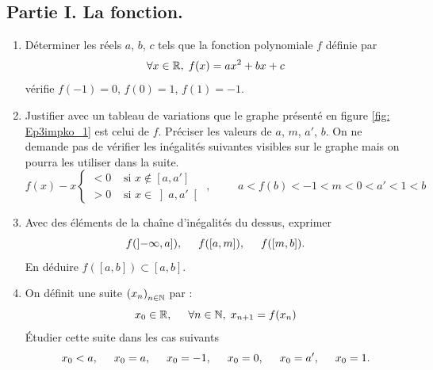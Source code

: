 \subsection*{Partie I. La fonction.}
\begin{enumerate}
  \item Déterminer les réels $a$, $b$, $c$ tels que la fonction polynomiale $f$ définie par 
\begin{displaymath}
  \forall x\in\mathbb{R},\; f(x) = ax^2 + bx + c
\end{displaymath}
vérifie $f(-1) = 0$, $f(0) = 1$, $f(1) = -1$.

  \item Justifier avec un tableau de variations que le graphe présenté en figure \ref{fig: Ep3impko_1} est celui de $f$. Préciser les valeurs de $a$, $m$, $a'$, $b$. On ne demande pas de vérifier les inégalités suivantes visibles sur le graphe mais on pourra les utiliser dans la suite.
\begin{displaymath}
f(x) - x 
\left\lbrace 
\begin{aligned}
  < 0 &\text{ si } x \notin \left[ a, a' \right]  \\
  > 0 &\text{ si } x \in \left] a, a' \right[
\end{aligned}
\right., \hspace{1cm}
a < f(b) < -1 < m < 0 < a' < 1 < b
\end{displaymath}

  \item Avec des éléments de la chaîne d'inégalités du dessus, exprimer
\begin{displaymath}
  f(\left] -\infty , a\right]),\hspace{0.5cm} f([a,m]),\hspace{0.5cm} f([m,b]).
\end{displaymath}
En déduire $f([a,b])\subset [a,b]$.

  \item On définit une suite $\left( x_n\right)_{n\in \mathbb{N}}$ par :
  \begin{displaymath}
x_0 \in \mathbb{R}, \hspace{0.5cm} \forall n\in \mathbb{N}, \; x_{n+1} = f(x_n)    
  \end{displaymath}
\'Etudier cette suite dans les cas suivants
\begin{displaymath}
  x_0 < a, \hspace{0.5cm} x_0 = a, \hspace{0.5cm} x_0 = -1, \hspace{0.5cm} x_0 = 0, \hspace{0.5cm}
   x_0 = a', \hspace{0.5cm} x_0 = 1.
\end{displaymath}
\end{enumerate}

